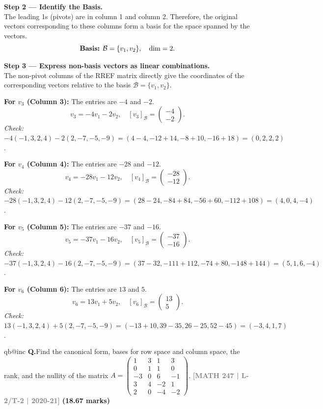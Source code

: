 \documentclass[12pt,a3paper]{article}
\makeatletter
\newcommand{\yr}[1]{\hfill\textcolor{gray}{\small\textbf{[#1]}}}
\newcommand{\mk}[1]{\textcolor{orange!70!black}{\small\textbf{(#1 marks)}}}
\newcounter{qnum}
\newcommand{\Q}[1]{%
  \csname qb@inc\endcsname
  \needspace{4\baselineskip}
  \refstepcounter{qnum}
  \vspace{6pt}
  \noindent\textbf{Q\theqnum.}\enspace #1\par
}
\makeatother
\begin{document}
\begin{tcolorbox}
\textbf{Step 2 --- Identify the Basis.} \\
The leading 1s (pivots) are in column 1 and column 2. Therefore, the original vectors corresponding to these columns form a basis for the space spanned by the vectors.
\[
\text{\textbf{Basis:} } \mathcal{B} = \{v_1, v_2\}, \quad \dim = 2.
\]

\medskip
\textbf{Step 3 --- Express non-basis vectors as linear combinations.} \\
The non-pivot columns of the RREF matrix directly give the coordinates of the corresponding vectors relative to the basis $\mathcal{B} = \{v_1, v_2\}$. 

\textbf{For $v_3$ (Column 3):} The entries are $-4$ and $-2$.
\[
\boxed{v_3 = -4v_1 - 2v_2}, \quad [v_3]_{\mathcal{B}} = \begin{pmatrix} -4 \\ -2 \end{pmatrix}.
\]
\textit{Check:} $-4(-1,3,2,4)-2(2,-7,-5,-9) = (4-4, -12+14, -8+10, -16+18) = (0,2,2,2)$. \checkmark

\textbf{For $v_4$ (Column 4):} The entries are $-28$ and $-12$.
\[
\boxed{v_4 = -28v_1 - 12v_2}, \quad [v_4]_{\mathcal{B}} = \begin{pmatrix} -28 \\ -12 \end{pmatrix}.
\]
\textit{Check:} $-28(-1,3,2,4)-12(2,-7,-5,-9) = (28-24, -84+84, -56+60, -112+108) = (4,0,4,-4)$. \checkmark

\textbf{For $v_5$ (Column 5):} The entries are $-37$ and $-16$.
\[
\boxed{v_5 = -37v_1 - 16v_2}, \quad [v_5]_{\mathcal{B}} = \begin{pmatrix} -37 \\ -16 \end{pmatrix}.
\]
\textit{Check:} $-37(-1,3,2,4)-16(2,-7,-5,-9) = (37-32, -111+112, -74+80, -148+144) = (5,1,6,-4)$. \checkmark

\textbf{For $v_6$ (Column 6):} The entries are $13$ and $5$.
\[
\boxed{v_6 = 13v_1 + 5v_2}, \quad [v_6]_{\mathcal{B}} = \begin{pmatrix} 13 \\ 5 \end{pmatrix}.
\]
\textit{Check:} $13(-1,3,2,4)+5(2,-7,-5,-9) = (-13+10, 39-35, 26-25, 52-45) = (-3,4,1,7)$. \checkmark

\end{tcolorbox}

\Q{Find the canonical form, bases for row space and column space, the rank, and the nullity of the matrix $A = \begin{pmatrix} 1 & 3 & 1 & 3 \\ 0 & 1 & 1 & 0 \\ -3 & 0 & 6 & -1 \\ 3 & 4 & -2 & 1 \\ 2 & 0 & -4 & -2 \end{pmatrix}$.
\yr{MATH 247 | L-2/T-2 | 2020-21} \mk{18.67}}
\end{document}
